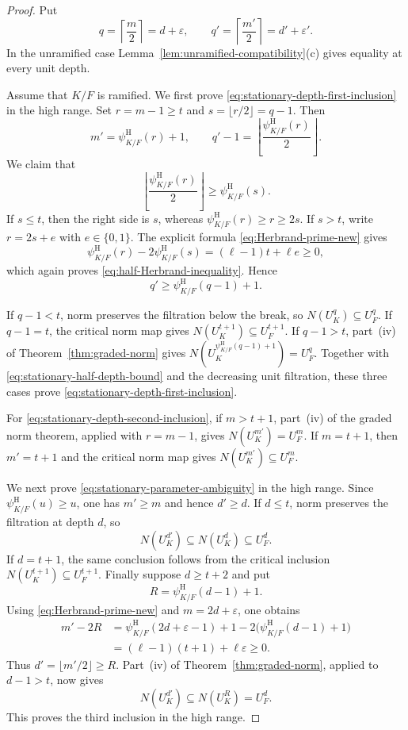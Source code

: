 \documentclass[11pt]{amsart}
\theoremstyle{definition}
\theoremstyle{remark}
\newcommand{\HerbPsi}{\psi^{\mathrm H}}
\begin{document}
\begin{proof}
Put
\[
 q=\left\lceil\frac m2\right\rceil=d+\varepsilon,
 \qquad
 q'=\left\lceil\frac {m'}2\right\rceil=d'+\varepsilon'.
\]
In the unramified case Lemma~\ref{lem:unramified-compatibility}(c)
gives equality at every unit depth.

Assume that $K/F$ is ramified.  We first prove
\eqref{eq:stationary-depth-first-inclusion} in the high range.  Set
$r=m-1\ge t$ and $s=\lfloor r/2\rfloor=q-1$.  Then
\[
 m'=\HerbPsi_{K/F}(r)+1,
 \qquad
 q'-1=\left\lfloor\frac{\HerbPsi_{K/F}(r)}2\right\rfloor.
\]
We claim that
\begin{equation}\label{eq:half-Herbrand-inequality}
 \left\lfloor\frac{\HerbPsi_{K/F}(r)}2\right\rfloor
 \ge \HerbPsi_{K/F}(s).
\end{equation}
If $s\le t$, then the right side is $s$, whereas
$\HerbPsi_{K/F}(r)\ge r\ge2s$.  If $s>t$, write
$r=2s+e$ with $e\in\{0,1\}$.  The explicit formula
\eqref{eq:Herbrand-prime-new} gives
\[
 \HerbPsi_{K/F}(r)-2\HerbPsi_{K/F}(s)
   =(\ell-1)t+\ell e\ge0,
\]
which again proves \eqref{eq:half-Herbrand-inequality}.  Hence
\begin{equation}\label{eq:stationary-half-depth-bound}
 q'\ge\HerbPsi_{K/F}(q-1)+1.
\end{equation}

If $q-1<t$, norm preserves the filtration below the break, so
$N(U_K^q)\subseteq U_F^q$.  If $q-1=t$, the critical norm map gives
$N(U_K^{t+1})\subseteq U_F^{t+1}$.  If $q-1>t$, part~(iv) of
Theorem~\ref{thm:graded-norm} gives
$N(U_K^{\HerbPsi_{K/F}(q-1)+1})=U_F^q$.  Together with
\eqref{eq:stationary-half-depth-bound} and the decreasing unit
filtration, these three cases prove
\eqref{eq:stationary-depth-first-inclusion}.

For \eqref{eq:stationary-depth-second-inclusion}, if $m>t+1$,
part~(iv) of the graded norm theorem, applied with $r=m-1$, gives
$N(U_K^{m'})=U_F^m$.  If $m=t+1$, then $m'=t+1$ and the critical norm
map gives $N(U_K^{m'})\subseteq U_F^m$.

We next prove \eqref{eq:stationary-parameter-ambiguity} in the high
range.  Since $\HerbPsi_{K/F}(u)\ge u$, one has $m'\ge m$ and hence
$d'\ge d$.  If $d\le t$, norm preserves the filtration at depth $d$,
so
\[
 N(U_K^{d'})\subseteq N(U_K^d)\subseteq U_F^d.
\]
If $d=t+1$, the same conclusion follows from the critical inclusion
$N(U_K^{t+1})\subseteq U_F^{t+1}$.  Finally suppose $d\ge t+2$ and put
\[
 R=\HerbPsi_{K/F}(d-1)+1.
\]
Using \eqref{eq:Herbrand-prime-new} and $m=2d+\varepsilon$, one obtains
\begin{align*}
 m'-2R
 &=\HerbPsi_{K/F}(2d+\varepsilon-1)+1
     -2\bigl(\HerbPsi_{K/F}(d-1)+1\bigr)\\
 &=(\ell-1)(t+1)+\ell\varepsilon\ge0.
\end{align*}
Thus $d'=\lfloor m'/2\rfloor\ge R$.  Part~(iv) of
Theorem~\ref{thm:graded-norm}, applied to $d-1>t$, now gives
\[
 N(U_K^{d'})\subseteq N(U_K^R)=U_F^d.
\]
This proves the third inclusion in the high range.


\end{proof}
\end{document}
